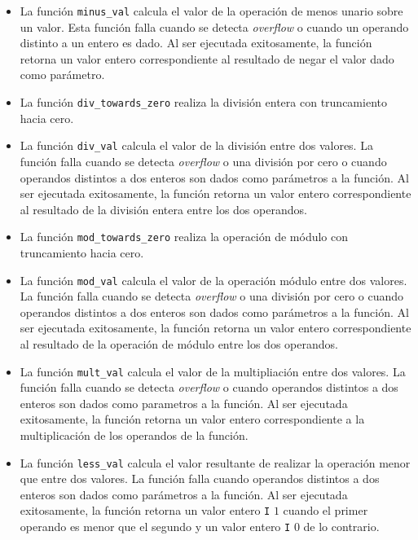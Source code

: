 \begin{itemize}
\item{La función \verb|minus_val| calcula el valor de la operación de menos unario sobre un valor.
Esta función falla cuando se detecta \textit{overflow} o cuando un operando distinto a un entero es dado.
Al ser ejecutada exitosamente, la función retorna un valor entero correspondiente al resultado de negar el valor dado como parámetro.}

\item{La función \verb|div_towards_zero| realiza la división entera con truncamiento hacia cero.}

\item{La función \verb|div_val| calcula el valor de la división entre dos valores.
La función falla cuando se detecta \textit{overflow} o una división por cero o cuando operandos distintos a dos enteros son dados como parámetros a la función.
Al ser ejecutada exitosamente, la función retorna un valor entero correspondiente al resultado de la división entera entre los dos operandos.}

\item{La función \verb|mod_towards_zero| realiza la operación de módulo con truncamiento hacia cero.}

\item{La función \verb|mod_val| calcula el valor de la operación módulo entre dos valores.
La función falla cuando se detecta \textit{overflow} o una división por cero o cuando operandos distintos a dos enteros son dados como parámetros a la función.
Al ser ejecutada exitosamente, la función retorna un valor entero correspondiente al resultado de la operación de módulo entre los dos operandos.}

\item{La función \verb|mult_val| calcula el valor de la multipliación entre dos valores.
La función falla cuando se detecta \textit{overflow} o cuando operandos distintos a dos enteros son dados como parametros a la función. 
Al ser ejecutada exitosamente, la función retorna un valor entero correspondiente a la multiplicación de los operandos de la función.}

\item{La función \verb|less_val| calcula el valor resultante de realizar la operación menor que entre dos valores.
La función falla cuando operandos distintos a dos enteros son dados como parámetros a la función.
Al ser ejecutada exitosamente, la función retorna un valor entero \verb|I| $1$ cuando el primer operando es menor que el segundo y un valor entero \verb|I| $0$ de lo contrario.}


\end{itemize}

